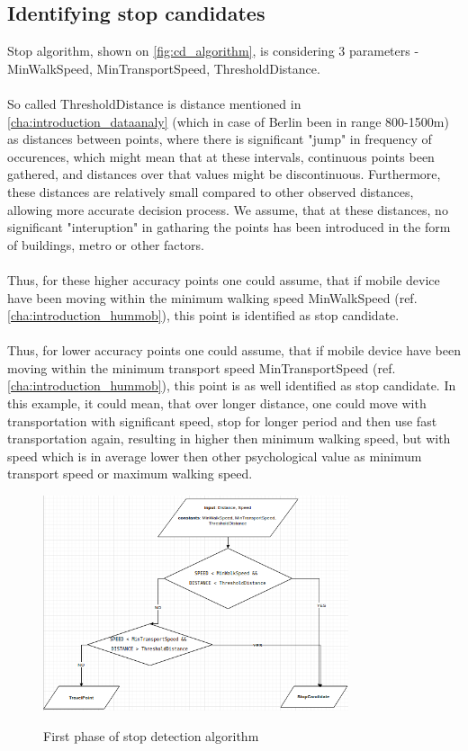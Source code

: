 \subsection{Identifying stop candidates}

Stop algorithm, shown on \autoref{fig:cd_algorithm}, is considering 3 parameters - MinWalkSpeed, MinTransportSpeed, ThresholdDistance. 
\\\\
So called ThresholdDistance is distance mentioned in \autoref{cha:introduction_dataanaly} (which in case of Berlin been in range 800-1500m) as distances between points, where there is significant "jump" in frequency of occurences, which might mean that at these intervals, continuous points been gathered, and distances over that values might be discontinuous. Furthermore, these distances are relatively small compared to other observed distances, allowing more accurate decision process. We assume, that at these distances, no significant "interuption" in gatharing the points has been introduced in the form of buildings, metro or other factors.
\\\\
Thus, for these higher accuracy points one could assume, that if mobile device have been moving within the minimum walking speed MinWalkSpeed (ref. \autoref{cha:introduction_hummob}), this point is identified as stop candidate. 
\\\\
Thus, for lower accuracy points one could assume, that if mobile device have been moving within the minimum transport speed MinTransportSpeed (ref. \autoref{cha:introduction_hummob}), this point is as well identified as stop candidate. In this example, it could mean, that over longer distance, one could move with transportation with significant speed, stop for longer period and then use fast transportation again, resulting in higher then minimum walking speed, but with speed which is in average lower then other psychological value as minimum transport speed or maximum walking speed.
\begin{figure}[!ht]
	\centering
	\includegraphics[width=0.8\textwidth]{images/stop_algorithm_1.png}\\
	\caption{First phase of stop detection algorithm  }
	\label{fig:cd_algorithm}
\end{figure}

